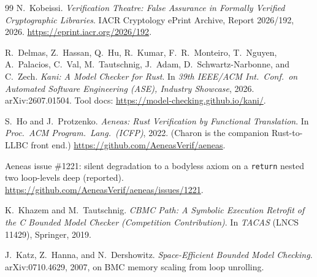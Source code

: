 \documentclass[10pt,twocolumn]{article}
\newcommand{\code}[1]{\texttt{\small #1}}
\begin{document}
\begin{thebibliography}{99}
N.~Kobeissi.
\emph{Verification Theatre: False Assurance in Formally Verified Cryptographic
Libraries}.
IACR Cryptology ePrint Archive, Report 2026/192, 2026.
\url{https://eprint.iacr.org/2026/192}.

R.~Delmas, Z.~Hassan, Q.~Hu, R.~Kumar, F.~R.~Monteiro, T.~Nguyen, A.~Palacios,
C.~Val, M.~Tautschnig, J.~Adam, D.~Schwartz-Narbonne, and C.~Zech.
\emph{Kani: A Model Checker for Rust}.
In \emph{39th IEEE/ACM Int.\ Conf.\ on Automated Software Engineering (ASE),
Industry Showcase}, 2026. arXiv:2607.01504. Tool docs:
\url{https://model-checking.github.io/kani/}.

S.~Ho and J.~Protzenko.
\emph{Aeneas: Rust Verification by Functional Translation}.
In \emph{Proc.\ ACM Program.\ Lang.\ (ICFP)}, 2022. (Charon is the companion
Rust-to-LLBC front end.) \url{https://github.com/AeneasVerif/aeneas}.

Aeneas issue \#1221: silent degradation to a bodyless axiom on a \code{return}
nested two loop-levels deep (reported).
\url{https://github.com/AeneasVerif/aeneas/issues/1221}.

K.~Khazem and M.~Tautschnig.
\emph{CBMC Path: A Symbolic Execution Retrofit of the C Bounded Model Checker
(Competition Contribution)}.
In \emph{TACAS} (LNCS 11429), Springer, 2019.

J.~Katz, Z.~Hanna, and N.~Dershowitz.
\emph{Space-Efficient Bounded Model Checking}.
arXiv:0710.4629, 2007, on BMC memory scaling from loop unrolling.

\end{thebibliography}
\end{document}
